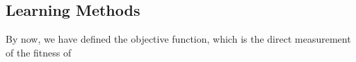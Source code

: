 \subsection {Learning Methods}
By now, we have defined the objective function, which is the direct measurement of the fitness of 